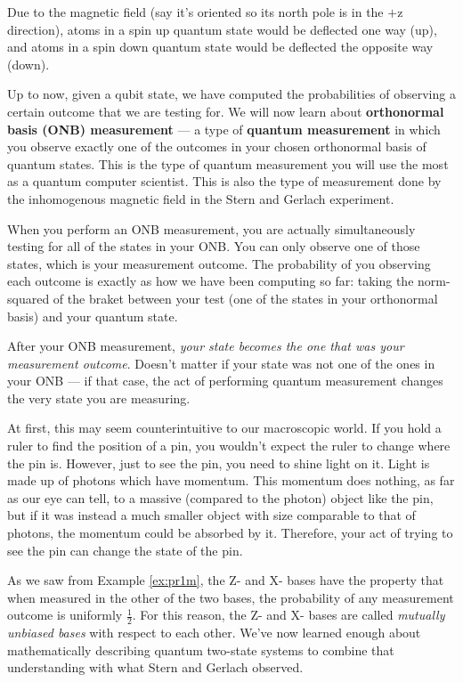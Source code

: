 \documentclass{article}
\theoremstyle{definition}
\begin{document}
Due to the magnetic field (say it's oriented so its north pole is in the $+$z direction), atoms in a spin up quantum state would be deflected one way (up), and atoms in a spin down quantum state would be deflected the opposite way (down).

Up to now, given a qubit state, we have computed the probabilities of observing a certain outcome that we are testing for.  We will now learn about \textbf{orthonormal basis (ONB) measurement} --- a type of \textbf{quantum measurement} in which you observe exactly one of the outcomes in your chosen orthonormal basis of quantum states.  This is the type of quantum measurement you will use the most as a quantum computer scientist.  This is also the type of measurement done by the inhomogenous magnetic field in the Stern and Gerlach experiment.

When you perform an ONB measurement, you are actually simultaneously testing for all of the states in your ONB.  You can only observe one of those states, which is your measurement outcome.  The probability of you observing each outcome is exactly as how we have been computing so far: taking the norm-squared of the braket between your test (one of the states in your orthonormal basis) and your quantum state.

After your ONB measurement, \textit{your state becomes the one that was your measurement outcome}.  Doesn't matter if your state was not one of the ones in your ONB --- if that case, the act of performing quantum measurement changes the very state you are measuring.

At first, this may seem counterintuitive to our macroscopic world.  If you hold a ruler to find the position of a pin, you wouldn't expect the ruler to change where the pin is.  However, just to see the pin, you need to shine light on it.  Light is made up of photons which have momentum.  This momentum does nothing, as far as our eye can tell, to a massive (compared to the photon) object like the pin, but if it was instead a much smaller object with size comparable to that of photons, the momentum could be absorbed by it.  Therefore, your act of trying to see the pin can change the state of the pin.

As we saw from Example \ref{ex:pr1m}, the Z- and X- bases have the property that when measured in the other of the two bases, the probability of any measurement outcome is uniformly $\frac{1}{2}$.  For this reason, the Z- and X- bases are called \textit{mutually unbiased bases} with respect to each other.  We've now learned enough about mathematically describing quantum two-state systems to combine that understanding with what Stern and Gerlach observed.
\end{document}
